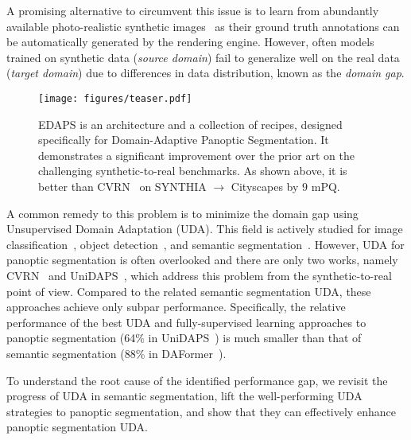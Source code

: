 \documentclass[10pt,twocolumn,letterpaper]{article}
\begin{document}
A promising alternative to circumvent this issue is  
to learn from abundantly available photo-realistic synthetic images~\cite{ros2016synthia,richter2016playing} as their ground truth annotations can be automatically generated by the rendering engine.
However, often models trained on synthetic data (\emph{source domain})
fail to generalize well on the real data (\emph{target domain}) due to differences in data distribution, known as the \textit{domain gap}.

\begin{figure}[t]
  \centering
   \texttt{[image: figures/teaser.pdf]}
   \caption{
   EDAPS is an architecture and a collection of recipes, designed specifically for Domain-Adaptive Panoptic Segmentation. 
   It demonstrates a significant improvement over the prior art on the challenging synthetic-to-real benchmarks.
   As shown above, it is better than CVRN~\cite{huang2021cross} on SYNTHIA $\rightarrow$ Cityscapes by $9$ mPQ. 
   }
   \label{fig:teaser}
\end{figure}


A common remedy to this problem is to minimize the domain gap using Unsupervised Domain Adaptation (UDA).
This field is actively studied for 
image classification~\cite{
long2015learning,ganin2016domain,long2018conditional,saito2018maximum,pan2019transferrable}, 
object detection~\cite{
chen2018domain,saito2019strong, xu2020cross, chen2021scale, li2022cross}, 
and semantic segmentation~\cite{
hoffman2016fcns,tsai2018learning,hoffman2018cycada,li2019bidirectional,saha2021learning,tranheden2021dacs,hoyer2021daformer}.
However, UDA for panoptic segmentation is often overlooked and there are only two works, namely CVRN~\cite{huang2021cross} and UniDAPS~\cite{zhang2022hierarchical}, which address this problem from the synthetic-to-real point of view. 
Compared to the related semantic segmentation UDA, these approaches achieve only subpar performance. 
Specifically, the relative performance of the best UDA and fully-supervised learning approaches to panoptic segmentation (64\% in UniDAPS~\cite{zhang2022hierarchical}) is much smaller than that of semantic segmentation (88\% in DAFormer~\cite{hoyer2021daformer}).

To understand the root cause of the identified performance gap, we revisit the progress of UDA in semantic segmentation, lift the well-performing UDA strategies to panoptic segmentation, and show that they can effectively enhance panoptic segmentation UDA.
\end{document}
